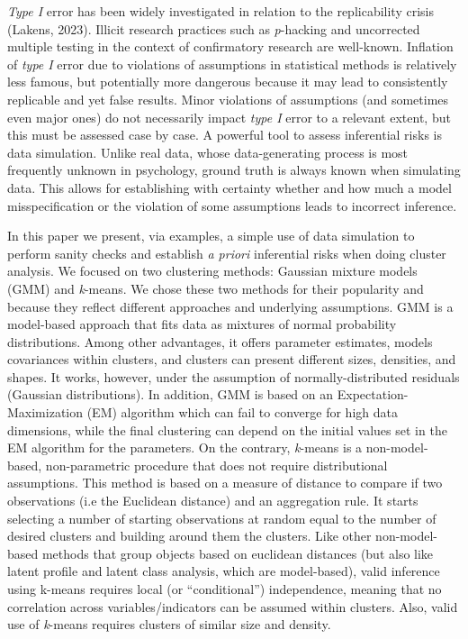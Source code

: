 \documentclass[
  man,floatsintext]{apa7}
\begin{document}
\emph{Type I} error has been widely investigated in relation to the replicability crisis (Lakens, 2023). Illicit research practices such as \emph{p}-hacking and uncorrected multiple testing in the context of confirmatory research are well-known. Inflation of \emph{type I} error due to violations of assumptions in statistical methods is relatively less famous, but potentially more dangerous because it may lead to consistently replicable and yet false results. Minor violations of assumptions (and sometimes even major ones) do not necessarily impact \emph{type I} error to a relevant extent, but this must be assessed case by case. A powerful tool to assess inferential risks is data simulation. Unlike real data, whose data-generating process is most frequently unknown in psychology, ground truth is always known when simulating data. This allows for establishing with certainty whether and how much a model misspecification or the violation of some assumptions leads to incorrect inference.

In this paper we present, via examples, a simple use of data simulation to perform sanity checks and establish \emph{a priori} inferential risks when doing cluster analysis. We focused on two clustering methods: Gaussian mixture models (GMM) and \emph{k}-means. We chose these two methods for their popularity and because they reflect different approaches and underlying assumptions. GMM is a model-based approach that fits data as mixtures of normal probability distributions. Among other advantages, it offers parameter estimates, models covariances within clusters, and clusters can present different sizes, densities, and shapes. It works, however, under the assumption of normally-distributed residuals (Gaussian distributions). In addition, GMM is based on an Expectation-Maximization (EM) algorithm which can fail to converge for high data dimensions, while the final clustering can depend on the initial values set in the EM algorithm for the parameters. On the contrary, \emph{k}-means is a non-model-based, non-parametric procedure that does not require distributional assumptions. This method is based on a measure of distance to compare if two observations (i.e the Euclidean distance) and an aggregation rule. It starts selecting a number of starting observations at random equal to the number of desired clusters and building around them the clusters. Like other non-model-based methods that group objects based on euclidean distances (but also like latent profile and latent class analysis, which are model-based), valid inference using k-means requires local (or ``conditional'') independence, meaning that no correlation across variables/indicators can be assumed within clusters. Also, valid use of \emph{k}-means requires clusters of similar size and density.
\end{document}
